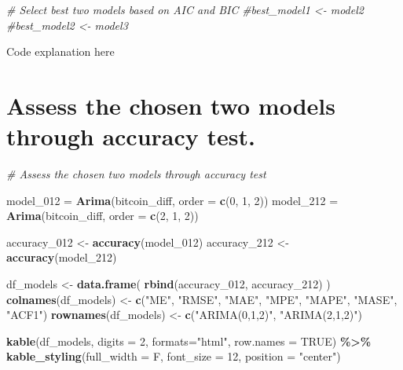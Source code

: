 \documentclass[
]{book}
\newenvironment{Shaded}{\begin{snugshade}}{\end{snugshade}}
\newcommand{\AttributeTok}[1]{\textcolor[rgb]{0.13,0.29,0.53}{#1}}
\newcommand{\CommentTok}[1]{\textcolor[rgb]{0.56,0.35,0.01}{\textit{#1}}}
\newcommand{\ConstantTok}[1]{\textcolor[rgb]{0.56,0.35,0.01}{#1}}
\newcommand{\DecValTok}[1]{\textcolor[rgb]{0.00,0.00,0.81}{#1}}
\newcommand{\FunctionTok}[1]{\textcolor[rgb]{0.13,0.29,0.53}{\textbf{#1}}}
\newcommand{\NormalTok}[1]{#1}
\newcommand{\OtherTok}[1]{\textcolor[rgb]{0.56,0.35,0.01}{#1}}
\newcommand{\SpecialCharTok}[1]{\textcolor[rgb]{0.81,0.36,0.00}{\textbf{#1}}}
\newcommand{\StringTok}[1]{\textcolor[rgb]{0.31,0.60,0.02}{#1}}
\begin{document}
\begin{Shaded}
\begin{Highlighting}[]
\CommentTok{\# Select best two models based on AIC and BIC}
\CommentTok{\#best\_model1 \textless{}{-} model2}
\CommentTok{\#best\_model2 \textless{}{-} model3}
\end{Highlighting}
\end{Shaded}

Code explanation here

\section{Assess the chosen two models through accuracy test.}\label{assess-the-chosen-two-models-through-accuracy-test.}

\begin{Shaded}
\begin{Highlighting}[]
\CommentTok{\# Assess the chosen two models through accuracy test}

\NormalTok{model\_012 }\OtherTok{=} \FunctionTok{Arima}\NormalTok{(bitcoin\_diff, }\AttributeTok{order =} \FunctionTok{c}\NormalTok{(}\DecValTok{0}\NormalTok{, }\DecValTok{1}\NormalTok{, }\DecValTok{2}\NormalTok{))}
\NormalTok{model\_212 }\OtherTok{=} \FunctionTok{Arima}\NormalTok{(bitcoin\_diff, }\AttributeTok{order =} \FunctionTok{c}\NormalTok{(}\DecValTok{2}\NormalTok{, }\DecValTok{1}\NormalTok{, }\DecValTok{2}\NormalTok{))}

\NormalTok{accuracy\_012 }\OtherTok{\textless{}{-}} \FunctionTok{accuracy}\NormalTok{(model\_012)}
\NormalTok{accuracy\_212 }\OtherTok{\textless{}{-}} \FunctionTok{accuracy}\NormalTok{(model\_212)}



\NormalTok{df\_models }\OtherTok{\textless{}{-}} \FunctionTok{data.frame}\NormalTok{(}
\FunctionTok{rbind}\NormalTok{(accuracy\_012, accuracy\_212)}
\NormalTok{)}
\FunctionTok{colnames}\NormalTok{(df\_models) }\OtherTok{\textless{}{-}} \FunctionTok{c}\NormalTok{(}\StringTok{"ME"}\NormalTok{, }\StringTok{"RMSE"}\NormalTok{, }\StringTok{"MAE"}\NormalTok{, }\StringTok{"MPE"}\NormalTok{, }\StringTok{"MAPE"}\NormalTok{, }\StringTok{"MASE"}\NormalTok{, }\StringTok{"ACF1"}\NormalTok{)}
\FunctionTok{rownames}\NormalTok{(df\_models) }\OtherTok{\textless{}{-}} \FunctionTok{c}\NormalTok{(}\StringTok{"ARIMA(0,1,2)"}\NormalTok{,  }\StringTok{"ARIMA(2,1,2)"}\NormalTok{)}

\FunctionTok{kable}\NormalTok{(df\_models, }\AttributeTok{digits =} \DecValTok{2}\NormalTok{, }\AttributeTok{formats=}\StringTok{"html"}\NormalTok{, }\AttributeTok{row.names =} \ConstantTok{TRUE}\NormalTok{) }\SpecialCharTok{\%\textgreater{}\%}
  \FunctionTok{kable\_styling}\NormalTok{(}\AttributeTok{full\_width =}\NormalTok{ F, }\AttributeTok{font\_size =} \DecValTok{12}\NormalTok{, }\AttributeTok{position =} \StringTok{"center"}\NormalTok{)}
\end{Highlighting}
\end{Shaded}
\end{document}
